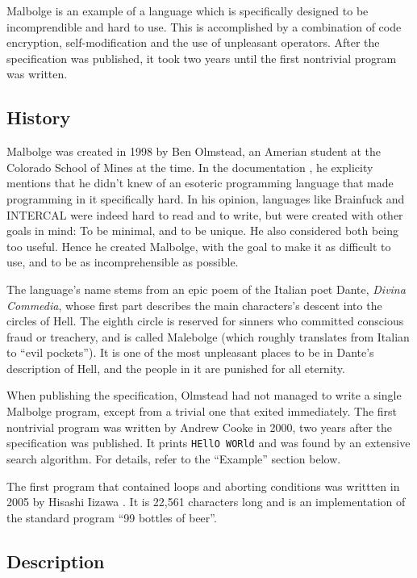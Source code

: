 Malbolge is an example of a language which is specifically designed to be incomprendible and hard to use. This is accomplished by a combination of code encryption, self-modification and the use of unpleasant operators. After the specification was published, it took two years until the first nontrivial program was written.

\subsection{History}

Malbolge was created in 1998 by Ben Olmstead, an Amerian student at the Colorado School of Mines at the time. In the documentation \cite{olmstead1998malbolge}, he explicity mentions that he didn't knew of an esoteric programming language that made programming in it specifically hard. In his opinion, languages like Brainfuck and INTERCAL were indeed hard to read and to write, but were created with other goals in mind: To be minimal, and to be unique. He also considered both being too useful. Hence he created Malbolge, with the goal to make it as difficult to use, and to be as incomprehensible as possible.

The language's name stems from an epic poem of the Italian poet Dante, \emph{Divina Commedia}, whose first part describes the main characters's descent into the circles of Hell. The eighth circle is reserved for sinners who committed conscious fraud or treachery, and is called Malebolge (which roughly translates from Italian to “evil pockets”). It is one of the most unpleasant places to be in Dante's description of Hell, and the people in it are punished for all eternity.

When publishing the specification, Olmstead had not managed to write a single Malbolge program, except from a trivial one that exited immediately. The first nontrivial program was written by Andrew Cooke in 2000, two years after the specification was published. It prints \texttt{HEllO WORld} \cite{cooke2000malbolge} and was found by an extensive search algorithm. For details, refer to the “Example” section below.

The first program that contained loops and aborting conditions was writtten in 2005 by Hisashi Iizawa \cite{iizawa2005malbolge}. It is 22,561 characters long and is an implementation of the standard program “99 bottles of beer”.

\subsection{Description}

